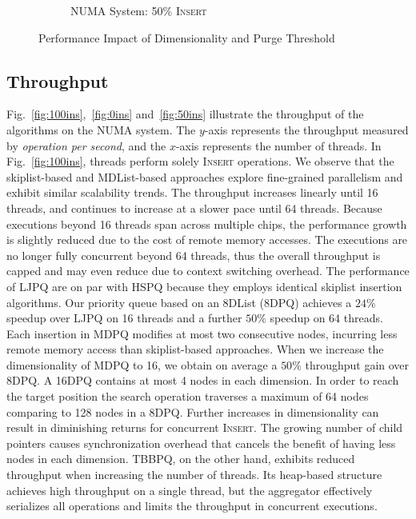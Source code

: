 \documentclass[10pt,journal,letter,compsoc]{IEEEtran}
\begin{document}
\begin{figure}[t]
\begin{subfigure}{0.33\textwidth}
        \vspace{-0.17in}
        \caption{NUMA System: 50\% \textsc{Insert}}
        \label{fig:prgsweep}
    \end{subfigure}
    \caption{Performance Impact of Dimensionality and Purge Threshold}
    \label{fig:sweep}
    \vspace{-0.2in}
\end{figure}

\subsection{Throughput}
Fig.~\ref{fig:100ins},~\ref{fig:0ins} and~\ref{fig:50ins} illustrate the throughput of the algorithms on the NUMA system.
The $y$-axis represents the throughput measured by \emph{operation per second}, and the $x$-axis represents the number of threads.
In Fig.~\ref{fig:100ins}, threads perform solely \textsc{Insert} operations.
We observe that the skiplist-based and MDList-based approaches explore fine-grained parallelism and exhibit similar scalability trends.
The throughput increases linearly until 16 threads, and continues to increase at a slower pace until 64 threads.
Because executions beyond 16 threads span across multiple chips, the performance growth is slightly reduced due to the cost of remote memory accesses.
The executions are no longer fully concurrent beyond 64 threads, thus the overall throughput is capped and may even reduce due to context switching overhead.
The performance of LJPQ are on par with HSPQ because they employs identical skiplist insertion algorithms.
Our priority queue based on an 8DList (8DPQ) achieves a $24\%$ speedup over LJPQ on 16 threads and a further $50\%$ speedup on 64 threads.
Each insertion in MDPQ modifies at most two consecutive nodes, incurring less remote memory access than skiplist-based approaches.
When we increase the dimensionality of MDPQ to 16, we obtain on average a $50\%$ throughput gain over 8DPQ.
A 16DPQ contains at most 4 nodes in each dimension.
In order to reach the target position the search operation traverses a maximum of 64 nodes comparing to 128 nodes in a 8DPQ.
Further increases in dimensionality can result in diminishing returns for concurrent \textsc{Insert}.
The growing number of child pointers causes synchronization overhead that cancels the benefit of having less nodes in each dimension.
TBBPQ, on the other hand, exhibits reduced throughput when increasing the number of threads.
Its heap-based structure achieves high throughput on a single thread, but the aggregator effectively serializes all operations and limits the throughput in concurrent executions.
\end{document}
